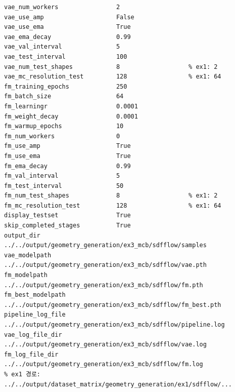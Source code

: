 \documentclass[11pt]{article}
\begin{document}
\begin{Verbatim}[fontsize=\footnotesize, frame=single, framesep=2mm]
vae_num_workers                2
vae_use_amp                    False
vae_use_ema                    True
vae_ema_decay                  0.99
vae_val_interval               5
vae_test_interval              100
vae_num_test_shapes            8                   % ex1: 2
vae_mc_resolution_test         128                 % ex1: 64
fm_training_epochs             250
fm_batch_size                  64
fm_learningr                   0.0001
fm_weight_decay                0.0001
fm_warmup_epochs               10
fm_num_workers                 0
fm_use_amp                     True
fm_use_ema                     True
fm_ema_decay                   0.99
fm_val_interval                5
fm_test_interval               50
fm_num_test_shapes             8                   % ex1: 2
fm_mc_resolution_test          128                 % ex1: 64
display_testset                True
skip_completed_stages          True
output_dir                     ../../output/geometry_generation/ex3_mcb/sdfflow/samples
vae_modelpath                  ../../output/geometry_generation/ex3_mcb/sdfflow/vae.pth
fm_modelpath                   ../../output/geometry_generation/ex3_mcb/sdfflow/fm.pth
fm_best_modelpath              ../../output/geometry_generation/ex3_mcb/sdfflow/fm_best.pth
pipeline_log_file              ../../output/geometry_generation/ex3_mcb/sdfflow/pipeline.log
vae_log_file_dir               ../../output/geometry_generation/ex3_mcb/sdfflow/vae.log
fm_log_file_dir                ../../output/geometry_generation/ex3_mcb/sdfflow/fm.log
% ex1 경로: ../../output/dataset_matrix/geometry_generation/ex1/sdfflow/...
\end{Verbatim}
\end{document}
